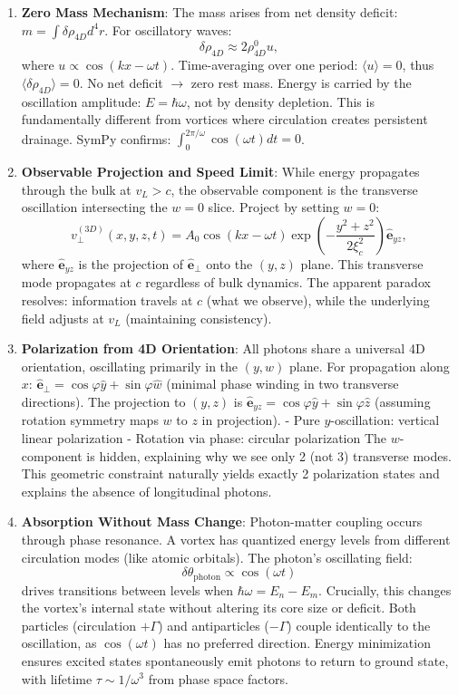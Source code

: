 \begin{enumerate}
\item \textbf{Zero Mass Mechanism}: The mass arises from net density deficit: $m = \int \delta\rho_{4D} d^4r$. For oscillatory waves:
   \[
   \delta\rho_{4D} \approx 2 \rho_{4D}^0 u,
   \]
   where $u \propto \cos(kx - \omega t)$. Time-averaging over one period: $\langle u \rangle = 0$, thus $\langle \delta\rho_{4D} \rangle = 0$. No net deficit $\to$ zero rest mass. Energy is carried by the oscillation amplitude: $E = \hbar\omega$, not by density depletion. This is fundamentally different from vortices where circulation creates persistent drainage. SymPy confirms: $\int_0^{2\pi/\omega} \cos(\omega t) dt = 0$.

\item \textbf{Observable Projection and Speed Limit}: While energy propagates through the bulk at $v_L > c$, the observable component is the transverse oscillation intersecting the $w=0$ slice. Project by setting $w=0$:
   \[
   v_\perp^{(3D)}(x,y,z,t) = A_0 \cos(kx - \omega t) \exp\left(-\frac{y^2 + z^2}{2\xi_c^2}\right) \hat{\mathbf{e}}_{yz},
   \]
   where $\hat{\mathbf{e}}_{yz}$ is the projection of $\hat{\mathbf{e}}_\perp$ onto the $(y,z)$ plane. This transverse mode propagates at $c$ regardless of bulk dynamics. The apparent paradox resolves: information travels at $c$ (what we observe), while the underlying field adjusts at $v_L$ (maintaining consistency).

\item \textbf{Polarization from 4D Orientation}: All photons share a universal 4D orientation, oscillating primarily in the $(y,w)$ plane. For propagation along $x$: $\hat{\mathbf{e}}_\perp = \cos\varphi \hat{y} + \sin\varphi \hat{w}$ (minimal phase winding in two transverse directions). The projection to $(y,z)$ is $\hat{\mathbf{e}}_{yz} = \cos\varphi \hat{y} + \sin\varphi \hat{z}$ (assuming rotation symmetry maps $w$ to $z$ in projection).
   - Pure $y$-oscillation: vertical linear polarization
   - Rotation via phase: circular polarization
   The $w$-component is hidden, explaining why we see only 2 (not 3) transverse modes. This geometric constraint naturally yields exactly 2 polarization states and explains the absence of longitudinal photons.

\item \textbf{Absorption Without Mass Change}: Photon-matter coupling occurs through phase resonance. A vortex has quantized energy levels from different circulation modes (like atomic orbitals). The photon's oscillating field:
   \[
   \delta\theta_{\text{photon}} \propto \cos(\omega t)
   \]
   drives transitions between levels when $\hbar\omega = E_n - E_m$. Crucially, this changes the vortex's internal state without altering its core size or deficit. Both particles (circulation $+\Gamma$) and antiparticles ($-\Gamma$) couple identically to the oscillation, as $\cos(\omega t)$ has no preferred direction. Energy minimization ensures excited states spontaneously emit photons to return to ground state, with lifetime $\tau \sim 1/\omega^3$ from phase space factors.


\end{enumerate}
